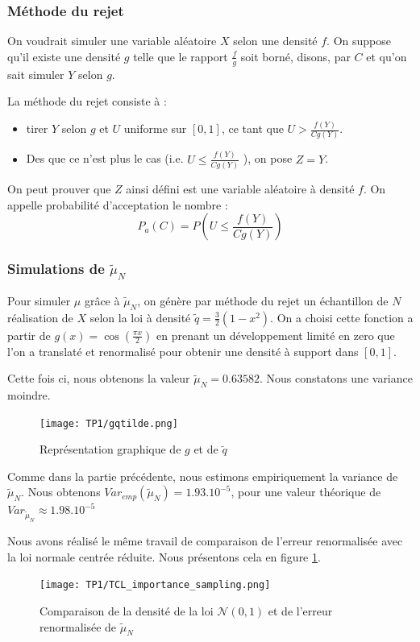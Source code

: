 \documentclass{article}
\begin{document}
\subsubsection{Méthode du rejet}
 On voudrait simuler une variable aléatoire $X$
 selon une densité $f$.
 On suppose qu'il existe une densité $g$ telle que le rapport $\frac{f}{g}$ soit borné, disons, par $C$ et qu'on 
 sait simuler $Y$ selon $g$.

 La méthode du rejet consiste à :
 \begin{itemize}
   \item tirer $Y$ selon $g$ et $U$ uniforme sur $[0,1]$,
ce tant que $U>\frac{f(Y)}{Cg(Y)}$. 
   \item Des que ce n'est plus le cas (i.e. $U\leq \frac{f(Y)}{Cg(Y)}$ ), on pose $Z=Y$.
\end{itemize}
On peut prouver que $Z$ ainsi défini est une variable aléatoire à densité $f$.
On appelle probabilité d'acceptation le nombre :
\[P_{a}(C)=P(U\leq \frac{f(Y)}{Cg(Y)})\]
\subsubsection{Simulations de $\tilde{\mu}_{N}$}

Pour simuler $\mu$ grâce à $\tilde{\mu}_{N}$, on génère par méthode du rejet un échantillon de $N$
réalisation de $X$ selon la loi à densité $\tilde{q} = \frac{3}{2}(1 - x^2)  $. On a choisi cette
fonction a partir de $g(x)= \cos (\frac{\pi x}{2})$  en prenant un développement
limité en zero que l'on a translaté et renormalisé pour obtenir une densité à 
support dans $[0,1]$.

Cette fois ci, nous obtenons la valeur $\tilde{\mu}_{N}=0.63582$. Nous constatons une variance moindre. 

\begin{figure}
   \centering
   \caption{Représentation graphique de $g$ et de $\tilde{q}$}
   \texttt{[image: TP1/gqtilde.png]}
\end{figure}

Comme dans la partie précédente, nous estimons empiriquement la variance de $\tilde{\mu}_{N}$. Nous obtenons
$Var_{emp}(\tilde{\mu}_{N})=1.93.10^{-5}$, pour une valeur théorique de $Var_{\tilde{\mu}_{N}}\approx 1.98.10^{-5}$

Nous avons réalisé le même travail de comparaison de l'erreur renormalisée avec
la loi normale centrée réduite. Nous présentons cela en figure \ref{TCL_imp}. 

\begin{figure}[h!]
   \centering
   \label{TCL_imp}
   \caption{Comparaison de la densité de la loi $\mathcal{N}(0,1)$ et de l'erreur renormalisée de $\tilde{\mu}_{N}$ }
   \texttt{[image: TP1/TCL\_importance\_sampling.png]}
\end{figure}
\end{document}
